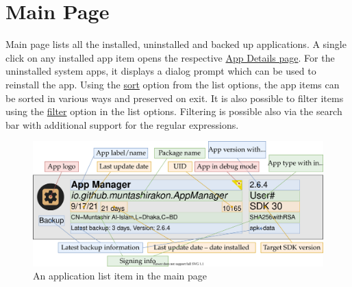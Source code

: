 \section{Main Page}\label{sec:main-page} %
Main page lists all the installed, uninstalled and backed up applications. A single click on any installed app item
opens the respective \hyperref[sec:app-details-page]{App Details page}. For the uninstalled system apps, it displays a
dialog prompt which can be used to reinstall the app. Using the \hyperlink{par:main-page-sort}{sort} option from the
list options, the app items can be sorted in various ways and preserved on exit. It is also possible to filter items
using the \hyperlink{par:main-page-filter}{filter} option in the list options. Filtering is possible also via the search
bar with additional support for the regular expressions.

\begin{figure}[ht]
    \centering
    \includegraphics{./images/main_page_entry_info_labeled.svg}
    \caption{An application list item in the main page} %
    \label{fig:main_page_entry_info_labeled}
\end{figure}

